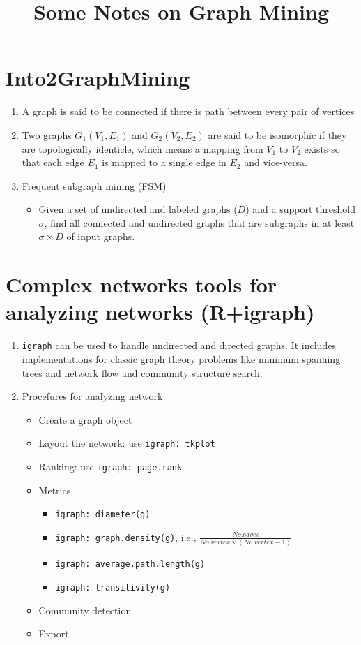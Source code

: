 \documentclass[14pt]{article}
\begin{document}
\title{Some Notes on Graph Mining}
\maketitle

\section{Into2GraphMining}
\begin{enumerate}
 \item A graph is said to be connected if there is path between every pair of vertices
 \item Two graphs $G_1(V_1,E_1)$ and $G_2(V_2,E_2)$ are said to be isomorphic if they are topologically identicle, which means a mapping from $V_1$ to $V_2$ exists so that each edge $E_1$ is mapped to a single edge in $E_2$ and vice-versa.
 \item Frequent subgraph mining (FSM)
  \begin{itemize}
   \item Given a set of undirected and labeled graphs ($D$) and a support threshold $\sigma$, find all connected and undirected graphs that are subgraphs in at least $\sigma \times D$ of input graphs.
  \end{itemize}
\end{enumerate}

\section{Complex networks tools for analyzing networks (R+igraph)}
\begin{enumerate}
 \item \texttt{igraph} can be used to handle undirected and directed graphs. It includes implementations for classic graph theory problems like minimum spanning trees and network flow and community structure search.
 \item Procefures for analyzing network
  \begin{itemize}
   \item Create a graph object
   \item Layout the network: use \texttt{igraph: tkplot}
   \item Ranking: use  \texttt{igraph: page.rank}
   \item Metrics
    \begin{itemize}
     \item \texttt{igraph: diameter(g)}
     \item \texttt{igraph: graph.density(g)}, i.e., $\frac{No.edges}{No.vertex \times (No.vertex-1)}$
     \item \texttt{igraph: average.path.length(g)}
     \item \texttt{igraph: transitivity(g)}
    \end{itemize}
   \item Community detection
   \item Export
  \end{itemize}
\end{enumerate}
\end{document}
